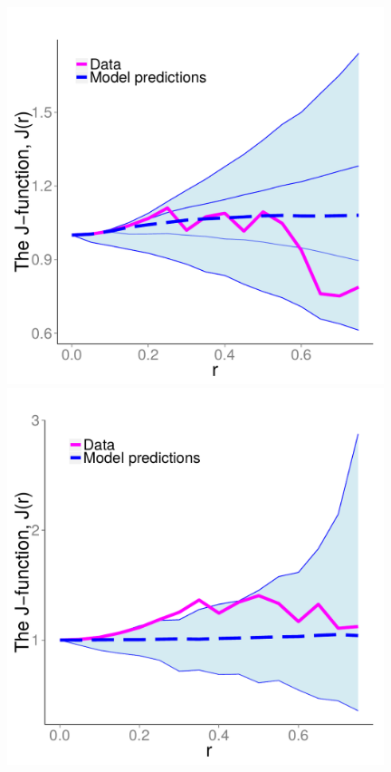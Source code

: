 \documentclass{statsoc}
\begin{document}
\begin{figure}
\begin{minipage}[h]{0.74\linewidth}
\begin{minipage}[h]{0.49\linewidth}
  \includegraphics[width=0.98\textwidth]{figs/Jfunc_postpred_R10/mod1_prob_full.pdf}
  \end{minipage}
  \begin{minipage}[h]{0.49\linewidth}
  \centering
  \includegraphics[width=0.98\textwidth]{figs/Jfunc_postpred_R10/mild1_gibbs.pdf}

\end{minipage}
\end{minipage}
\end{figure}
\end{document}
